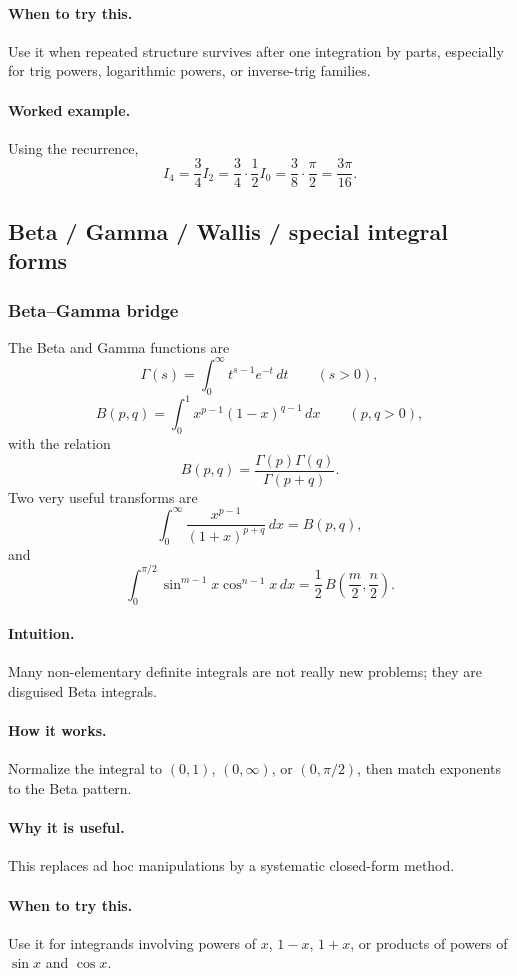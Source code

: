 \documentclass[12pt]{article}
\begin{document}
\paragraph{When to try this.}
Use it when repeated structure survives after one integration by parts, especially for trig powers, logarithmic powers, or inverse-trig families.

\paragraph{Worked example.}
Using the recurrence,
\[
I_4=\frac{3}{4}I_2
=\frac{3}{4}\cdot \frac12 I_0
=\frac{3}{8}\cdot \frac{\pi}{2}
=\frac{3\pi}{16}.
\]

\newpage
\subsection{Beta / Gamma / Wallis / special integral forms}
\subsubsection{Beta--Gamma bridge}
The Beta and Gamma functions are
\[
\Gamma(s)=\int_0^\infty t^{s-1}e^{-t}\,dt
\qquad (s>0),
\]
\[
B(p,q)=\int_0^1 x^{p-1}(1-x)^{q-1}\,dx
\qquad (p,q>0),
\]
with the relation
\[
B(p,q)=\frac{\Gamma(p)\Gamma(q)}{\Gamma(p+q)}.
\]
Two very useful transforms are
\[
\int_0^\infty \frac{x^{p-1}}{(1+x)^{p+q}}\,dx=B(p,q),
\]
and
\[
\int_0^{\pi/2}\sin^{m-1}x\cos^{n-1}x\,dx
=\frac12\,B\!\left(\frac{m}{2},\frac{n}{2}\right).
\]

\paragraph{Intuition.}
Many non-elementary definite integrals are not really new problems; they are disguised Beta integrals.

\paragraph{How it works.}
Normalize the integral to \((0,1)\), \((0,\infty)\), or \((0,\pi/2)\), then match exponents to the Beta pattern.

\paragraph{Why it is useful.}
This replaces ad hoc manipulations by a systematic closed-form method.

\paragraph{When to try this.}
Use it for integrands involving powers of \(x\), \(1-x\), \(1+x\), or products of powers of \(\sin x\) and \(\cos x\).
\end{document}
